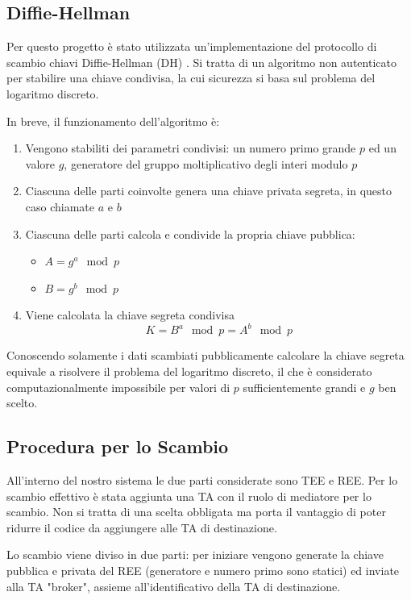 \documentclass[12pt,italian]{report}
\begin{document}
	\subsection{Diffie-Hellman}
	\label{subsec:dh}
	Per questo progetto è stato utilizzata un'implementazione del protocollo di scambio chiavi Diffie-Hellman (DH) \cite{dhexchange}. Si tratta di un algoritmo non autenticato per stabilire una chiave condivisa, la cui sicurezza si basa sul problema del logaritmo discreto.
	
	In breve, il funzionamento dell'algoritmo è:
	\begin{enumerate}
		\item Vengono stabiliti dei parametri condivisi: un numero primo grande $p$ ed un valore $g$, generatore del gruppo moltiplicativo degli interi modulo $p$ 
		\item Ciascuna delle parti coinvolte genera una chiave privata segreta, in questo caso chiamate $a$ e $b$
		\item Ciascuna delle parti calcola e condivide la propria chiave pubblica:
		\begin{itemize}[noitemsep,nolistsep,label=$-$]
			\item $A = g^a \mod p$
			\item $B = g^b \mod p$
		\end{itemize}
		\item Viene calcolata la chiave segreta condivisa
		$$ K = B^a \mod p = A^b \mod p $$
	\end{enumerate}
	Conoscendo solamente i dati scambiati pubblicamente calcolare la chiave segreta equivale a risolvere il problema del logaritmo discreto, il che è considerato computazionalmente impossibile per valori di $p$ sufficientemente grandi e $g$ ben scelto.
	
	\subsection{Procedura per lo Scambio}
	\label{subsec:proc_scambio}
	All'interno del nostro sistema le due parti considerate sono TEE e REE. Per lo scambio effettivo è stata aggiunta una TA con il ruolo di mediatore per lo scambio. Non si tratta di una scelta obbligata ma porta il vantaggio di poter ridurre il codice da aggiungere alle TA di destinazione. 
	
	\bigbreak
	
	Lo scambio viene diviso in due parti: per iniziare vengono generate la chiave pubblica e privata del REE (generatore e numero primo sono statici) ed inviate alla TA "broker", assieme all'identificativo della TA di destinazione.
	
\end{document}
